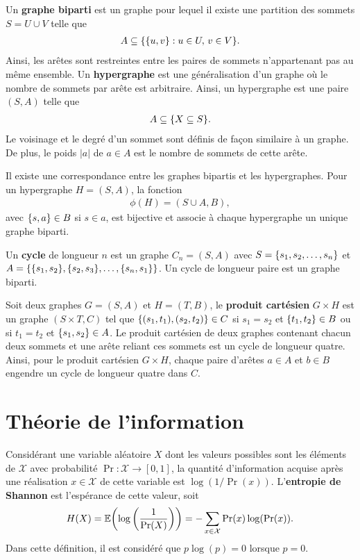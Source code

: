 Un \textbf{graphe biparti} est un graphe pour lequel il existe une 
partition des sommets $S = U \cup V$ telle que 
\begin{align}
  A \subseteq \qty{\qty{u, v} : u \in U,\, v \in V}.
\end{align}
Ainsi, les arêtes sont restreintes entre les paires de sommets n'appartenant pas
au même ensemble.
Un \textbf{hypergraphe} est une généralisation d'un graphe
où le nombre de sommets par arête est arbitraire.
Ainsi,
un hypergraphe est une paire $(S, A)$ telle que
\begin{align}
  A \subseteq \qty{X \subseteq S}.
\end{align}
Le voisinage et le degré d'un sommet sont définis de façon similaire à un graphe.
De plus, le poids $|a|$ de $a \in A$ est le nombre de sommets de cette arête.

Il existe une correspondance entre les graphes bipartis et les hypergraphes.
Pour un hypergraphe $H = (S, A)$,
la fonction 
\begin{align}
  \phi(H) = (S \cup A, B),
\end{align}
avec $\qty{s, a} \in B$ si $s \in a$,
est bijective et associe à chaque hypergraphe un unique graphe biparti.

Un \textbf{cycle} de longueur $n$ est un graphe $C_n = (S, A)$
avec $S = \qty{s_1, s_2, \ldots, s_n}$ et 
$A = \qty{\qty{s_1, s_2}, \qty{s_2, s_3}, \ldots, \qty{s_n, s_1}}$.
Un cycle de longueur paire est un graphe biparti.

Soit deux graphes $G = (S, A)$ et $H = (T, B)$,
le \textbf{produit cartésien} $G \times H$ est un graphe $(S \times T, C)$
tel que $\qty{(s_1, t_1), (s_2, t_2)} \in C$ si 
$s_1 = s_2$ et $\qty{t_1, t_2} \in B$ ou si $t_1 = t_2$ et $\qty{s_1, s_2} \in A$.
Le produit cartésien de deux graphes contenant chacun deux sommets et une arête reliant ces
sommets est un cycle de longueur quatre.
Ainsi,
pour le produit cartésien $G \times H$,
chaque paire d'arêtes $a \in A$ et $b \in B$ engendre un cycle de longueur quatre dans $C$.

\chapter{Théorie de l'information}
\label{chap:theo_info}

Considérant une variable aléatoire $X$ dont les valeurs possibles sont les éléments de $\mathcal X$
avec probabilité $\Pr: \mathcal X \to [0, 1]$,
la quantité d'information acquise après une réalisation $x \in \mathcal X$ de cette variable
est $\log(1/\Pr(x))$.
L'\textbf{entropie de Shannon} est l'espérance de cette valeur, soit 
\begin{align}
  H(X) = \mathbb E\qty(\log\qty(\frac{1}{\Pr(X)})) = -\sum_{x\in\mathcal X}\Pr(x) \log(\Pr (x)).
\end{align}
Dans cette définition,
il est considéré que $p\log(p) = 0$ lorsque $p = 0$.

